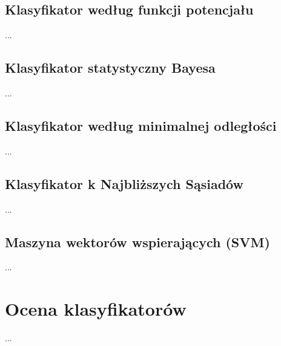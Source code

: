 \subsection{Klasyfikator według funkcji potencjału}
...
	
\subsection{Klasyfikator statystyczny Bayesa}
...
	
\subsection{Klasyfikator według minimalnej odległości}
...
	
\subsection{Klasyfikator k Najbliższych Sąsiadów}
...

\subsection{Maszyna wektorów wspierających (SVM)}
...
	
\section{Ocena klasyfikatorów}
...

